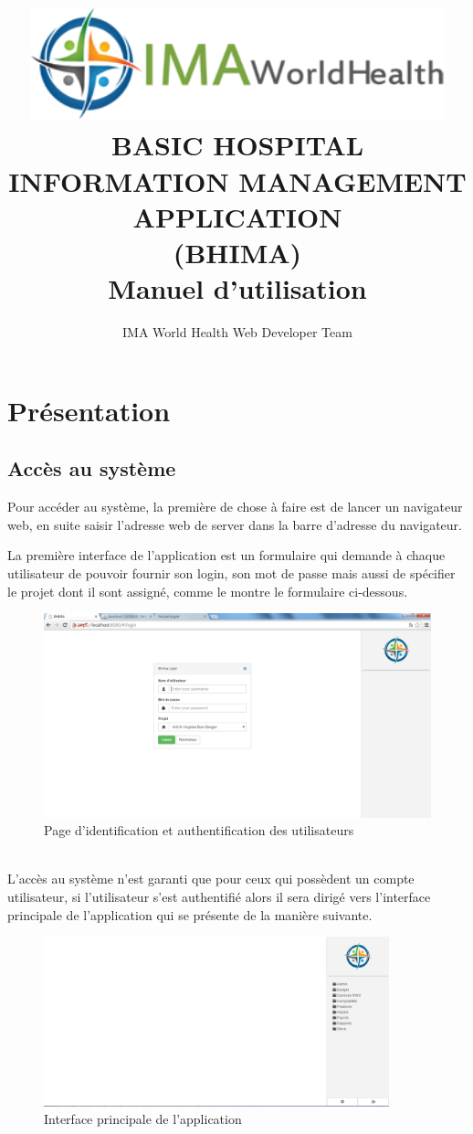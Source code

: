 \documentclass[12pt,a4paper]{report}
\author{IMA World Health Web Developer Team}
\title{\includegraphics[width=12cm]{ima.png} \\BASIC HOSPITAL INFORMATION MANAGEMENT APPLICATION\\ (BHIMA) \\ Manuel d'utilisation}
\begin{document}
 \maketitle 
\chapter{Présentation}
\section{Accès au système}
\large{Pour accéder au système, la première de chose à faire est de lancer un navigateur web, en suite saisir l'adresse web de server dans la barre d'adresse du navigateur.}

La première interface de l'application est un formulaire qui demande à chaque utilisateur de pouvoir fournir son login, son mot de passe mais aussi de spécifier  le projet dont il sont assigné, comme le montre le formulaire ci-dessous.
\begin{figure}[h]
\begin{center}
\includegraphics[width=12cm]{pic/login.png}
\end{center}
\caption{Page d'identification et authentification des utilisateurs}
\label{Page d'identification et authentification des utilisateurs}
\end{figure}
\\ L'accès au système n'est garanti que pour ceux qui possèdent un compte utilisateur, si l'utilisateur s'est authentifié alors il sera dirigé vers l'interface principale de l'application qui se présente de la manière suivante.
\newpage
\begin{figure}[h]
\begin{center} 
\includegraphics[width=10cm]{pic/mainInterface.png}
\end{center}
\caption{Interface principale de l'application}
\label{Interface principale de l'application}
\end{figure} 
\end{document}
